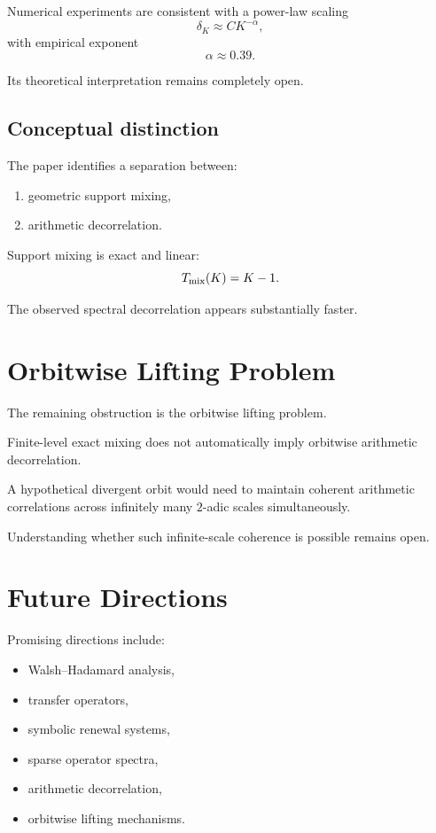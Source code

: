 \documentclass[11pt]{article}
\begin{document}
Numerical experiments are consistent with a power-law scaling
\[
\delta_K \approx C K^{-\alpha},
\]
with empirical exponent
\[
\alpha\approx0.39.
\]

Its theoretical interpretation remains completely open.

\subsection*{Conceptual distinction}

The paper identifies a separation between:

\begin{enumerate}
\item geometric support mixing,
\item arithmetic decorrelation.
\end{enumerate}

Support mixing is exact and linear:
\[
T_{\rm mix}(K)=K-1.
\]

The observed spectral decorrelation appears substantially faster.

\section{Orbitwise Lifting Problem}

The remaining obstruction is the orbitwise lifting problem.

Finite-level exact mixing does not automatically imply orbitwise arithmetic decorrelation.

A hypothetical divergent orbit would need to maintain coherent arithmetic correlations across infinitely many \(2\)-adic scales simultaneously.

Understanding whether such infinite-scale coherence is possible remains open.

\section{Future Directions}

Promising directions include:

\begin{itemize}
\item Walsh--Hadamard analysis,
\item transfer operators,
\item symbolic renewal systems,
\item sparse operator spectra,
\item arithmetic decorrelation,
\item orbitwise lifting mechanisms.
\end{itemize}
\end{document}

